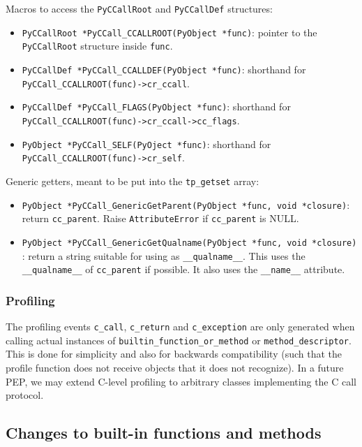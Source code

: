 Macros to access the \texttt{PyCCallRoot} and \texttt{PyCCallDef}
structures:

\begin{itemize}
\tightlist
\item
  \texttt{PyCCallRoot\ *PyCCall\_CCALLROOT(PyObject\ *func)}: pointer to
  the \texttt{PyCCallRoot} structure inside \texttt{func}.
\item
  \texttt{PyCCallDef\ *PyCCall\_CCALLDEF(PyObject\ *func)}: shorthand
  for \texttt{PyCCall\_CCALLROOT(func)-\textgreater{}cr\_ccall}.
\item
  \texttt{PyCCallDef\ *PyCCall\_FLAGS(PyObject\ *func)}: shorthand for
  \texttt{PyCCall\_CCALLROOT(func)-\textgreater{}cr\_ccall-\textgreater{}cc\_flags}.
\item
  \texttt{PyObject\ *PyCCall\_SELF(PyOject\ *func)}: shorthand for
  \texttt{PyCCall\_CCALLROOT(func)-\textgreater{}cr\_self}.
\end{itemize}

Generic getters, meant to be put into the \texttt{tp\_getset} array:

\begin{itemize}
\tightlist
\item
  \texttt{PyObject\ *PyCCall\_GenericGetParent(PyObject\ *func,\ void\ *closure)}:
  return \texttt{cc\_parent}. Raise \texttt{AttributeError} if
  \texttt{cc\_parent} is NULL.
\item
  \texttt{PyObject\ *PyCCall\_GenericGetQualname(PyObject\ *func,\ void\ *closure)}:
  return a string suitable for using as \texttt{\_\_qualname\_\_}. This
  uses the \texttt{\_\_qualname\_\_} of \texttt{cc\_parent} if possible.
  It also uses the \texttt{\_\_name\_\_} attribute.
\end{itemize}

\subsubsection{Profiling}

The profiling events \texttt{c\_call}, \texttt{c\_return} and
\texttt{c\_exception} are only generated when calling actual instances
of \texttt{builtin\_function\_or\_method} or
\texttt{method\_descriptor}. This is done for simplicity and also for
backwards compatibility (such that the profile function does not receive
objects that it does not recognize). In a future PEP, we may extend
C-level profiling to arbitrary classes implementing the C call protocol.

\subsection{Changes to built-in functions and methods}

